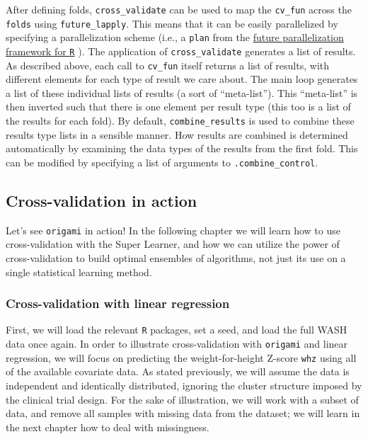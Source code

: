 \documentclass[12pt, krantz2,]{krantz}
\theoremstyle{definition}
\theoremstyle{definition}
\theoremstyle{definition}
\newcommand{\1}{\mathbbm{1}}
\begin{document}
After defining folds, \texttt{cross\_validate} can be used to map the \texttt{cv\_fun} across
the \texttt{folds} using \texttt{future\_lapply}. This means that it can be easily parallelized
by specifying a parallelization scheme (i.e., a \texttt{plan} from the \href{https://Cran.R-project.org/package=future}{future
parallelization framework for \texttt{R}}
\citep{bengtsson2020unifying}). The application of \texttt{cross\_validate} generates a list
of results. As described above, each call to \texttt{cv\_fun} itself returns a list of
results, with different elements for each type of result we care about. The main
loop generates a list of these individual lists of results (a sort of
``meta-list''). This ``meta-list'' is then inverted such that there is one element
per result type (this too is a list of the results for each fold). By default,
\texttt{combine\_results} is used to combine these results type lists in a sensible
manner. How results are combined is determined automatically by examining the
data types of the results from the first fold. This can be modified by
specifying a list of arguments to \texttt{.combine\_control}.

\hypertarget{cross-validation-in-action}{%
\subsection{Cross-validation in action}\label{cross-validation-in-action}}

Let's see \texttt{origami} in action! In the following chapter we will learn how to use
cross-validation with the Super Learner, and how we can utilize the power of
cross-validation to build optimal ensembles of algorithms, not just its use on a
single statistical learning method.

\hypertarget{cross-validation-with-linear-regression}{%
\subsubsection{Cross-validation with linear regression}\label{cross-validation-with-linear-regression}}

First, we will load the relevant \texttt{R} packages, set a seed, and load the full
WASH data once again. In order to illustrate cross-validation with \texttt{origami} and
linear regression, we will focus on predicting the weight-for-height Z-score
\texttt{whz} using all of the available covariate data. As stated previously, we will
assume the data is independent and identically distributed, ignoring the cluster
structure imposed by the clinical trial design. For the sake of illustration, we
will work with a subset of data, and remove all samples with missing data from
the dataset; we will learn in the next chapter how to deal with missingness.
\end{document}
